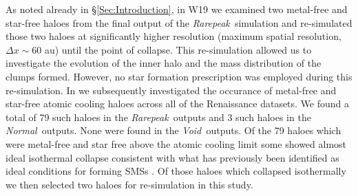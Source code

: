 \documentclass[graphics, twocolumn, usenatbib]{mn2e}
\newcommand{\rarepeak} {\textit{Rarepeak~}}
\newcommand{\normal} {\textit{Normal~}}
\newcommand{\void} {\textit{Void~}}
\begin{document}
 As noted already in \S \ref{Sec:Introduction}, in W19 we examined two metal-free and star-free
 haloes from the final output of the \rarepeak simulation and re-simulated those two haloes at
 significantly higher resolution (maximum spatial resolution, $\Delta x \sim 60$ au) until the
 point of collapse. This re-simulation allowed us to investigate the evolution of the inner halo
 and the mass distribution of the clumps formed. However, no star formation prescription was
 employed during this re-simulation. In \cite{Regan_2020} we subsequently investigated the occurance
 of metal-free and star-free atomic cooling haloes across all of the Renaissance datasets. We found
 a total of 79 such haloes in the
 \rarepeak outputs and 3 such haloes in the \normal outputs. None were found in the \void outputs.
 Of the 79 haloes which were metal-free and star free above the atomic cooling limit some
 showed almost ideal isothermal collapse consistent with what has previously been identified
 as ideal conditions for forming SMSs \citep{Inayoshi_2014, Becerra_2015, Latif_2016a,
   Regan_2017, Chon_2017b, Regan_2018b}. Of those haloes which collapsed isothermally we then
 selected two haloes for re-simulation in this study. \\
\end{document}
